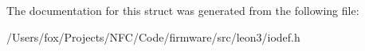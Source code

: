 The documentation for this struct was generated from the following file:\begin{DoxyCompactItemize}
\item 
/Users/fox/Projects/NFC/Code/firmware/src/leon3/iodef.h\end{DoxyCompactItemize}
